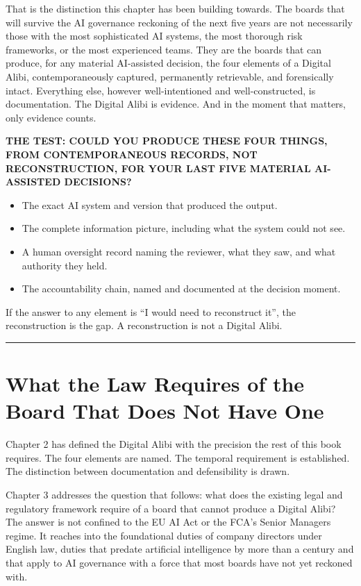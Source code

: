 That is the distinction this chapter has been building towards. The boards that will survive the AI governance reckoning of the next five years are not necessarily those with the most sophisticated AI systems, the most thorough risk frameworks, or the most experienced teams. They are the boards that can produce, for any material AI-assisted decision, the four elements of a Digital Alibi, contemporaneously captured, permanently retrievable, and forensically intact. Everything else, however well-intentioned and well-constructed, is documentation. The Digital Alibi is evidence. And in the moment that matters, only evidence counts.

\textbf{THE TEST: COULD YOU PRODUCE THESE FOUR THINGS, FROM CONTEMPORANEOUS RECORDS, NOT RECONSTRUCTION, FOR YOUR LAST FIVE MATERIAL AI-ASSISTED DECISIONS?}

\begin{itemize}
\tightlist
\item
  The exact AI system and version that produced the output.
\item
  The complete information picture, including what the system could not see.
\item
  A human oversight record naming the reviewer, what they saw, and what authority they held.
\item
  The accountability chain, named and documented at the decision moment.
\end{itemize}

If the answer to any element is ``I would need to reconstruct it'', the reconstruction is the gap. A reconstruction is not a Digital Alibi.

\begin{center}\rule{0.5\linewidth}{0.5pt}\end{center}

\section{What the Law Requires of the Board That Does Not Have One}

Chapter 2 has defined the Digital Alibi with the precision the rest of this book requires. The four elements are named. The temporal requirement is established. The distinction between documentation and defensibility is drawn.

Chapter 3 addresses the question that follows: what does the existing legal and regulatory framework require of a board that cannot produce a Digital Alibi? The answer is not confined to the EU AI Act or the FCA's Senior Managers regime. It reaches into the foundational duties of company directors under English law, duties that predate artificial intelligence by more than a century and that apply to AI governance with a force that most boards have not yet reckoned with.

